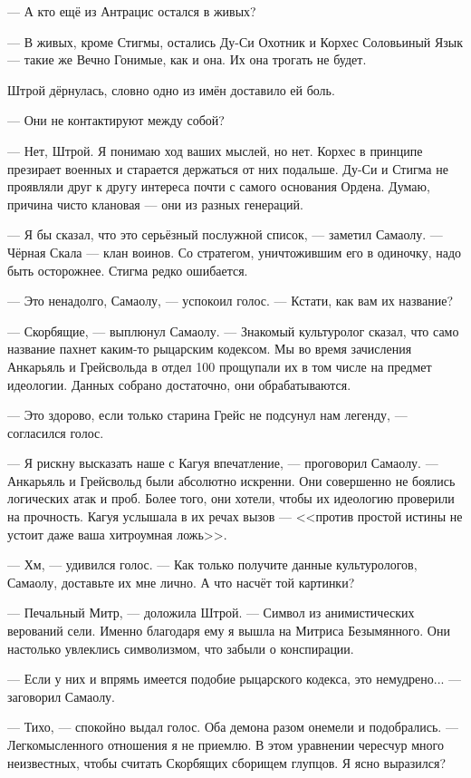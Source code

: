 --- А кто ещё из Антрацис остался в живых?

--- В живых, кроме Стигмы, остались Ду-Си Охотник и Корхес Соловьиный Язык --- такие же Вечно Гонимые, как и она.
Их она трогать не будет.

Штрой дёрнулась, словно одно из имён доставило ей боль.

--- Они не контактируют между собой?

--- Нет, Штрой.
Я понимаю ход ваших мыслей, но нет.
Корхес в принципе презирает военных и старается держаться от них подальше.
Ду-Си и Стигма не проявляли друг к другу интереса почти с самого основания Ордена.
Думаю, причина чисто клановая --- они из разных генераций.

--- Я бы сказал, что это серьёзный послужной список, --- заметил Самаолу.
--- Чёрная Скала --- клан воинов.
Со стратегом, уничтожившим его в одиночку, надо быть осторожнее.
Стигма редко ошибается.

--- Это ненадолго, Самаолу, --- успокоил голос.
--- Кстати, как вам их название?

--- Скорбящие, --- выплюнул Самаолу.
--- Знакомый культуролог сказал, что само название пахнет каким-то рыцарским кодексом.
Мы во время зачисления Анкарьяль и Грейсвольда в отдел 100 прощупали их в том числе на предмет идеологии.
Данных собрано достаточно, они обрабатываются.

--- Это здорово, если только старина Грейс не подсунул нам легенду, --- согласился голос.

--- Я рискну высказать наше с Кагуя впечатление, --- проговорил Самаолу.
--- Анкарьяль и Грейсвольд были абсолютно искренни.
Они совершенно не боялись логических атак и проб.
Более того, они хотели, чтобы их идеологию проверили на прочность.
Кагуя услышала в их речах вызов --- <<против простой истины не устоит даже ваша хитроумная ложь>>.

--- Хм, --- удивился голос.
--- Как только получите данные культурологов, Самаолу, доставьте их мне лично.
А что насчёт той картинки?

--- Печальный Митр, --- доложила Штрой.
--- Символ из анимистических верований сели.
Именно благодаря ему я вышла на Митриса Безымянного.
Они настолько увлеклись символизмом, что забыли о конспирации.

--- Если у них и впрямь имеется подобие рыцарского кодекса, это немудрено... --- заговорил Самаолу.

--- Тихо, --- спокойно выдал голос.
Оба демона разом онемели и подобрались.
--- Легкомысленного отношения я не приемлю.
В этом уравнении чересчур много неизвестных, чтобы считать Скорбящих сборищем глупцов.
Я ясно выразился?

